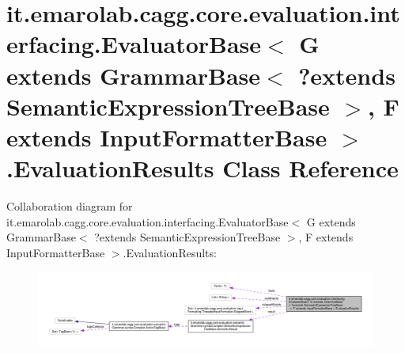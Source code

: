\hypertarget{classit_1_1emarolab_1_1cagg_1_1core_1_1evaluation_1_1interfacing_1_1EvaluatorBase_3_01G_01extend2adbebed3b043f34edcb0efa646badc7}{\section{it.\-emarolab.\-cagg.\-core.\-evaluation.\-interfacing.\-Evaluator\-Base$<$ G extends Grammar\-Base$<$ ?extends Semantic\-Expression\-Tree\-Base $>$, F extends Input\-Formatter\-Base $>$.Evaluation\-Results Class Reference}
\label{classit_1_1emarolab_1_1cagg_1_1core_1_1evaluation_1_1interfacing_1_1EvaluatorBase_3_01G_01extend2adbebed3b043f34edcb0efa646badc7}
}


Collaboration diagram for it.\-emarolab.\-cagg.\-core.\-evaluation.\-interfacing.\-Evaluator\-Base$<$ G extends Grammar\-Base$<$ ?extends Semantic\-Expression\-Tree\-Base $>$, F extends Input\-Formatter\-Base $>$.Evaluation\-Results\-:\nopagebreak
\begin{figure}[H]
\begin{center}
\leavevmode
\includegraphics[width=350pt]{classit_1_1emarolab_1_1cagg_1_1core_1_1evaluation_1_1interfacing_1_1EvaluatorBase_3_01G_01extenddabfb0d410055f4c84b7a1b51dbf5d10}
\end{center}
\end{figure}
